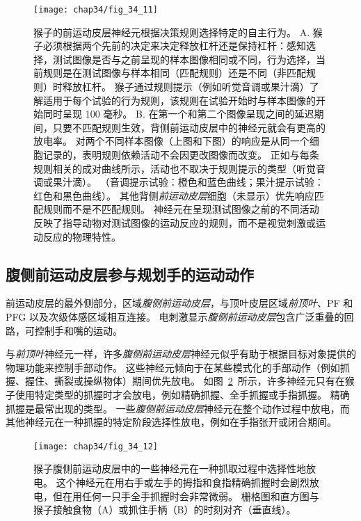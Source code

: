 \begin{figure}[htbp]
	\centering
	\texttt{[image: chap34/fig\_34\_11]}
	\caption{猴子的前运动皮层神经元根据决策规则选择特定的自主行为\cite{wallis2003rule}。
		A. 猴子必须根据两个先前的决定来决定释放杠杆还是保持杠杆：感知选择，测试图像是否与之前呈现的样本图像相同或不同，行为选择，当前规则是在测试图像与样本相同（匹配规则）还是不同（非匹配规则）时释放杠杆。
		猴子通过规则提示（例如听觉音调或果汁滴）了解适用于每个试验的行为规则，该规则在试验开始时与样本图像的开始同时呈现 100 毫秒。
		B. 在第一个和第二个图像呈现之间的延迟期间，只要不匹配规则生效，背侧前运动皮层中的神经元就会有更高的放电率。
		对两个不同样本图像（上图和下图）的响应是从同一个细胞记录的，表明规则依赖活动不会因更改图像而改变。
		正如与每条规则相关的成对曲线所示，活动也不取决于规则提示的类型（听觉音调或果汁滴）。
		（音调提示试验：橙色和蓝色曲线；果汁提示试验：红色和黑色曲线）。
		其他背侧\textit{前运动皮层}细胞（未显示）优先响应匹配规则而不是不匹配规则。
		神经元在呈现测试图像之前的不同活动反映了指导动物对测试图像的运动反应的规则，而不是视觉刺激或运动反应的物理特性。}
	\label{fig:34_11}
\end{figure}



\subsection{腹侧前运动皮层参与规划手的运动动作}

前运动皮层的最外侧部分，区域\textit{腹侧前运动皮层}，与顶叶皮层区域\textit{前顶叶}、PF 和 PFG 以及次级体感区域相互连接。
电刺激显示\textit{腹侧前运动皮层}包含广泛重叠的回路，可控制手和嘴的运动。


与\textit{前顶叶}神经元一样，许多\textit{腹侧前运动皮层}神经元似乎有助于根据目标对象提供的物理功能来控制手部动作。
这些神经元倾向于在某些模式化的手部动作（例如抓握、握住、撕裂或操纵物体）期间优先放电。
如图~\ref{fig:34_12}~所示，许多神经元只有在猴子使用特定类型的抓握时才会放电，例如精确抓握、全手抓握或手指抓握。
精确抓握是最常出现的类型。
一些\textit{腹侧前运动皮层}神经元在整个动作过程中放电，而其他神经元在一种抓握的特定阶段选择性放电，例如在手指张开或闭合期间。


\begin{figure}[htbp]
	\centering
	\texttt{[image: chap34/fig\_34\_12]}
	\caption{猴子腹侧前运动皮层中的一些神经元在一种抓取过程中选择性地放电。
		这个神经元在用右手或左手的拇指和食指精确抓握时会剧烈放电，但在用任何一只手全手抓握时会非常微弱。
		栅格图和直方图与猴子接触食物（A）或抓住手柄（B）的时刻对齐（垂直线）。}
	\label{fig:34_12}
\end{figure}


